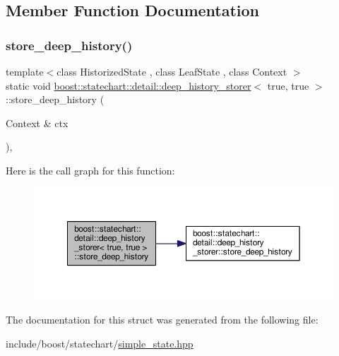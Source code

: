 \subsection{Member Function Documentation}
\mbox{\label{structboost_1_1statechart_1_1detail_1_1deep__history__storer_3_01true_00_01true_01_4_aa604cfd689442a9785a685cd003efe21}} 
\subsubsection{\texorpdfstring{store\+\_\+deep\+\_\+history()}{store\_deep\_history()}}
{\footnotesize\ttfamily template$<$class Historized\+State , class Leaf\+State , class Context $>$ \\
static void \mbox{\hyperlink{structboost_1_1statechart_1_1detail_1_1deep__history__storer}{boost\+::statechart\+::detail\+::deep\+\_\+history\+\_\+storer}}$<$ true, true $>$\+::store\+\_\+deep\+\_\+history (\begin{DoxyParamCaption}\item[{Context \&}]{ctx }\end{DoxyParamCaption})\hspace{0.3cm}{\ttfamily [inline]}, {\ttfamily [static]}}

Here is the call graph for this function\+:
\nopagebreak
\begin{figure}[H]
\begin{center}
\leavevmode
\includegraphics[width=350pt]{structboost_1_1statechart_1_1detail_1_1deep__history__storer_3_01true_00_01true_01_4_aa604cfd689442a9785a685cd003efe21_cgraph}
\end{center}
\end{figure}


The documentation for this struct was generated from the following file\+:\begin{DoxyCompactItemize}
\item 
include/boost/statechart/\mbox{\hyperlink{simple__state_8hpp}{simple\+\_\+state.\+hpp}}\end{DoxyCompactItemize}
